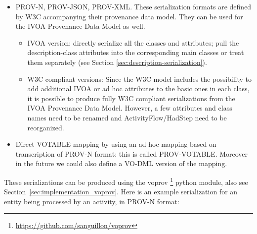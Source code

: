 \begin{itemize}

\item PROV-N, PROV-JSON, PROV-XML.
These serialization formats are defined by W3C accompanying their provenance data model. They can be used for the IVOA Provenance Data Model as well.
\begin{itemize}
\item IVOA version: directly serialize all the classes and attributes; pull the description-class attributes into the corresponding main classes or treat them separately (see Section \ref{sec:description-serialization}).
\item W3C compliant versions: Since the W3C model includes the possibility to add additional IVOA or ad hoc attributes to the basic ones in each class, it is possible to produce fully W3C compliant serializations from the IVOA Provenance Data Model. However, a few attributes and class names need to be renamed and ActivityFlow/HadStep need to be reorganized.
\end{itemize}


\item Direct VOTABLE mapping by using an ad hoc mapping based on transcription of PROV-N format: this is called PROV-VOTABLE. Moreover in the future we could also define a VO-DML \citep{std:VODML} version of the mapping.

\end{itemize}

These serializations can be produced using the voprov \footnote{\url{https://github.com/sanguillon/voprov}} python module, also see Section~\ref{sec:implementation_voprov}.
Here is an example serialization for an entity being processed by an activity, in PROV-N format:

